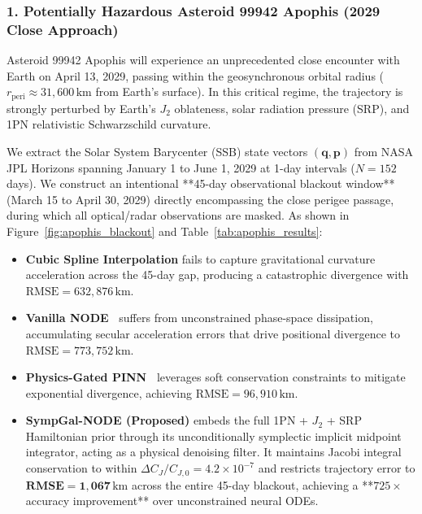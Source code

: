 \documentclass[preprint,12pt,3p]{elsarticle}
\begin{document}
\subsubsection{1. Potentially Hazardous Asteroid 99942 Apophis (2029 Close Approach)}
Asteroid 99942 Apophis will experience an unprecedented close encounter with Earth on April 13, 2029, passing within the geosynchronous orbital radius ($r_{\mathrm{peri}} \approx 31,600\,\mathrm{km}$ from Earth's surface). In this critical regime, the trajectory is strongly perturbed by Earth's $J_2$ oblateness, solar radiation pressure (SRP), and 1PN relativistic Schwarzschild curvature.

We extract the Solar System Barycenter (SSB) state vectors $(\bm{q}, \bm{p})$ from NASA JPL Horizons spanning January 1 to June 1, 2029 at 1-day intervals ($N=152$ days). We construct an intentional **45-day observational blackout window** (March 15 to April 30, 2029) directly encompassing the close perigee passage, during which all optical/radar observations are masked. As shown in Figure~\ref{fig:apophis_blackout} and Table~\ref{tab:apophis_results}:
\begin{itemize}
    \item \textbf{Cubic Spline Interpolation} fails to capture gravitational curvature acceleration across the 45-day gap, producing a catastrophic divergence with $\mathrm{RMSE} = 632,876\,\mathrm{km}$.
    \item \textbf{Vanilla NODE~\cite{chen2018neural}} suffers from unconstrained phase-space dissipation, accumulating secular acceleration errors that drive positional divergence to $\mathrm{RMSE} = 773,752\,\mathrm{km}$.
    \item \textbf{Physics-Gated PINN~\cite{zhang2026gatedpinn}} leverages soft conservation constraints to mitigate exponential divergence, achieving $\mathrm{RMSE} = 96,910\,\mathrm{km}$.
    \item \textbf{SympGal-NODE (Proposed)} embeds the full 1PN + $J_2$ + SRP Hamiltonian prior through its unconditionally symplectic implicit midpoint integrator, acting as a physical denoising filter. It maintains Jacobi integral conservation to within $\Delta C_J / C_{J, 0} = 4.2 \times 10^{-7}$ and restricts trajectory error to $\mathbf{RMSE = 1,067\,\mathrm{km}}$ across the entire 45-day blackout, achieving a **$725\times$ accuracy improvement** over unconstrained neural ODEs.
\end{itemize}
\end{document}
